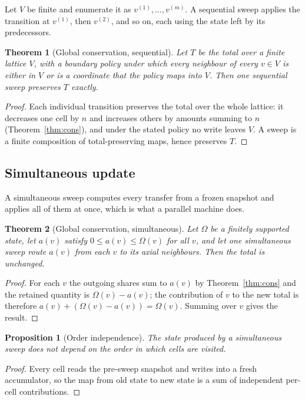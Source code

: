\documentclass[11pt,a4paper]{article}
\newtheorem{theorem}{Theorem}
\newtheorem{proposition}{Proposition}
\theoremstyle{definition}
\newcommand{\Om}{\Omega}
\begin{document}
Let $V$ be finite and enumerate it as $v^{(1)}, \ldots, v^{(m)}$. A sequential
sweep applies the transition at $v^{(1)}$, then $v^{(2)}$, and so on, each
using the state left by its predecessors.

\begin{theorem}[Global conservation, sequential]\label{thm:seq}
Let $T$ be the total over a finite lattice $V$, with a boundary policy under
which every neighbour of every $v \in V$ is either in $V$ or is a coordinate
that the policy maps into $V$. Then one sequential sweep preserves $T$
exactly.
\end{theorem}
\begin{proof}
Each individual transition preserves the total over the whole lattice: it
decreases one cell by $n$ and increases others by amounts summing to $n$
(Theorem~\ref{thm:cons}), and under the stated policy no write leaves $V$.
A sweep is a finite composition of total-preserving maps, hence preserves $T$.
\end{proof}

\subsection{Simultaneous update}

A simultaneous sweep computes every transfer from a frozen snapshot and
applies all of them at once, which is what a parallel machine does.

\begin{theorem}[Global conservation, simultaneous]\label{thm:sim}
Let $\Om$ be a finitely supported state, let $a(v)$ satisfy $0 \leq a(v) \leq
\Om(v)$ for all $v$, and let one simultaneous sweep route $a(v)$ from each $v$
to its axial neighbours. Then the total is unchanged.
\end{theorem}
\begin{proof}
For each $v$ the outgoing shares sum to $a(v)$ by Theorem~\ref{thm:cons} and
the retained quantity is $\Om(v) - a(v)$; the contribution of $v$ to the new
total is therefore $a(v) + (\Om(v) - a(v)) = \Om(v)$. Summing over $v$ gives
the result.
\end{proof}

\begin{proposition}[Order independence]\label{prop:order}
The state produced by a simultaneous sweep does not depend on the order in
which cells are visited.
\end{proposition}
\begin{proof}
Every cell reads the pre-sweep snapshot and writes into a fresh accumulator, so
the map from old state to new state is a sum of independent per-cell
contributions.
\end{proof}
\end{document}

